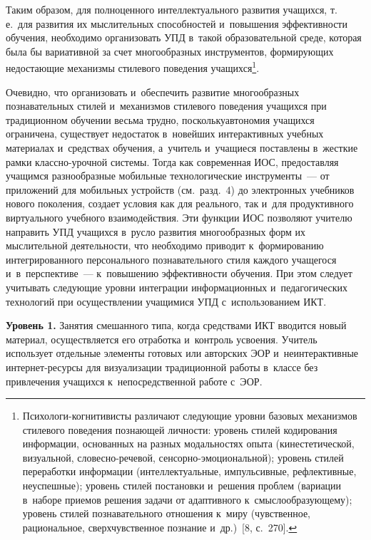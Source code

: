 \begin{multicols}{2}
   Таким образом, для полноценного интеллектуального развития учащихся, т.\,е.\ для
развития их мыслительных способностей и~повышения эффективности обучения, необходимо
организовать УПД в~такой образовательной среде, которая была бы вариативной за счет
многообразных инструментов, формирующих недостающие механизмы стилевого поведения
учащихся\footnote{Психологи-когнитивисты различают следующие уровни базовых
механизмов стилевого поведения познающей личности: уровень стилей кодирования
информации, основанных на разных модальностях опыта (кинестетической, визуальной,
   сло\-вес\-но-ре\-че\-вой, сен\-сор\-но-эмо\-ци\-о\-наль\-ной); уровень стилей переработки
информации (интеллектуальные, импульсивные, рефлективные, неуспешные); уровень стилей
постановки и~решения проблем (вариации в~наборе приемов решения задачи от адаптивного
к~смыс\-ло\-обра\-зу\-юще\-му); уровень стилей познавательного отношения к~миру (чувственное,
рациональное, сверхчувственное познание и~др.)~[8, с.~270].}.

   Очевидно, что организовать и~обеспечить развитие многообразных познавательных стилей
и~механизмов стилевого поведения учащихся при традиционном обучении весьма трудно,
поскольку\linebreak автономия учащихся ограничена, существует недостаток в~новейших интерактивных
учебных материалах и~средствах обучения, а~учитель и~учащиеся поставлены в~жесткие рамки
клас\-сно-уроч\-ной сис\-те\-мы. Тогда как современная ИОС, предоставляя учащимся разнообразные
мобильные технологические инструменты~--- от приложений для мобильных устройств (см.\
разд.~4) до электронных учебников нового поколения, создает условия как для реального, так
и~для продуктивного виртуального учебного взаимодействия. Эти функции ИОС позволяют
учителю направить УПД учащихся в~русло развития многообразных форм их мыслительной
дея\-тель\-ности, что необходимо приводит к~формированию интегрированного персонального
познавательного стиля каждого учащегося и~в~перспективе~--- к~повышению эффективности
обучения.
  При этом следует учитывать следующие уровни интеграции информационных
и~педагогических технологий при осуществлении учащимися УПД с~использованием ИКТ.

  \bigskip

  \textbf{Уровень 1.} Занятия смешанного типа, когда средствами ИКТ вводится новый
материал, осуществляется его отработка и~контроль усвоения. Учитель использует отдельные
элементы готовых или авторских ЭОР и~неинтерактивные ин\-тер\-нет-ре\-сур\-сы для
визуализации традиционной работы в~классе без привлечения учащихся к~непосредственной
работе с~ЭОР.


\end{multicols}
